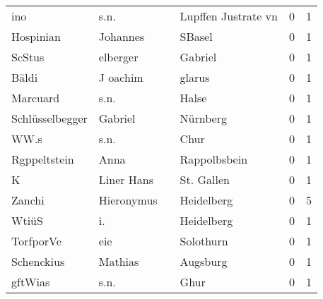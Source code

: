 \begin{tabular}{llllrr}
                      ino &                               s.n. &             &                         Lupffen Justrate vn &          0 &         1 \\
                Hospinian &                           Johannes &             &                                      SBasel &          0 &         1 \\
                   ScStus &                           elberger &             &                                     Gabriel &          0 &         1 \\
                    Bäldi &                           J oachim &             &                                      glarus &          0 &         1 \\
                 Marcuard &                               s.n. &             &                                       Halse &          0 &         1 \\
          Schlüsselbegger &                            Gabriel &             &                                    Nürnberg &          0 &         1 \\
                     WW.s &                               s.n. &             &                                        Chur &          0 &         1 \\
             Rgppeltstein &                               Anna &             &                                Rappolbsbein &          0 &         1 \\
                        K &                         Liner Hans &             &                                  St. Gallen &          0 &         1 \\
                   Zanchi &                         Hieronymus &             &                                  Heidelberg &          0 &         5 \\
                    WtiüS &                                 i. &             &                                  Heidelberg &          0 &         1 \\
                TorfporVe &                                eie &             &                                   Solothurn &          0 &         1 \\
               Schenckius &                            Mathias &             &                                    Augsburg &          0 &         1 \\
                  gftWias &                               s.n. &             &                                        Ghur &          0 &         1 \\

\end{tabular}

